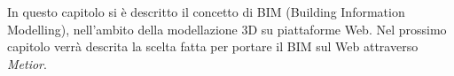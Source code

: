 In questo capitolo si è descritto il concetto di BIM (Building Information Modelling),
nell'ambito della modellazione 3D su piattaforme Web. Nel prossimo
capitolo verrà descrita la scelta fatta per portare il BIM sul Web attraverso \emph{Metior}.
